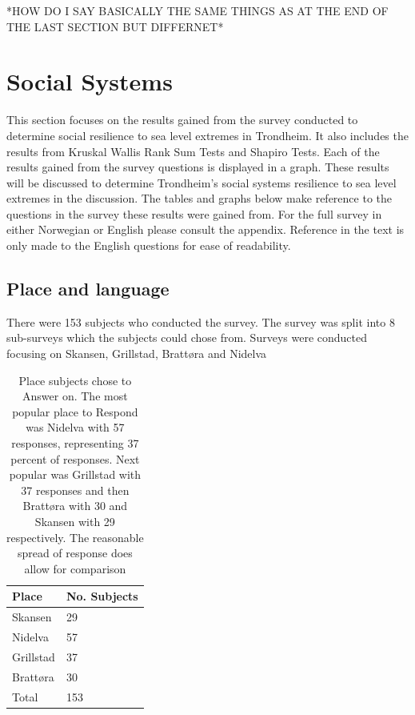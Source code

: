 *HOW DO I SAY BASICALLY THE SAME THINGS AS AT THE END OF THE LAST SECTION BUT DIFFERNET*


\section{Social Systems}

This section focuses on the results gained from the survey conducted to determine social resilience to sea level extremes in Trondheim.  It also includes the results from Kruskal Wallis Rank Sum Tests and Shapiro Tests. Each of the results gained from the survey questions is displayed in a graph. These results will be discussed to determine Trondheim's social systems resilience to sea level extremes in the discussion. The tables and graphs below make reference to  the questions in the survey these results were gained from. For the full survey in either Norwegian or English please consult the appendix. Reference in the text is only made to the English questions for ease of readability. 



\subsection{Place and language}
There were 153 subjects who conducted the survey. The survey was split into 8 sub-surveys which the subjects could chose from. Surveys were conducted focusing on Skansen, Grillstad, Brattøra and Nidelva
\begin{table}[h!]
    \centering
    \begin{tabular}{|l|l|}
    \hline
    Place  & No. Subjects  \\ \hline
      Skansen   & 29    \\ \hline
      Nidelva & 57      \\ \hline
      Grillstad & 37       \\ \hline
      Brattøra & 30     \\ \hline
      Total & 153   \\ \hline
     \end{tabular}
    \caption{Place subjects chose to Answer on. The most popular place to Respond was Nidelva with 57 responses, representing 37 percent of responses. Next popular was Grillstad with 37 responses and then Brattøra with 30 and Skansen with 29 respectively. The reasonable spread of response does allow for comparison}
    \label{tab:place}
\end{table}
\paragraph{}

